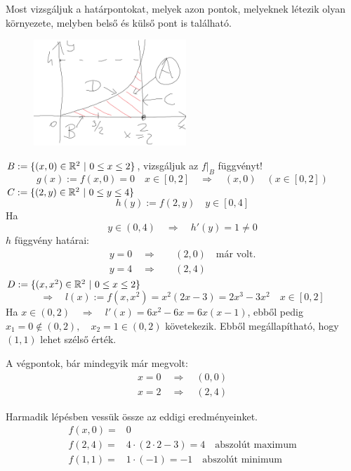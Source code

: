\documentclass[a4paper,11.5pt]{article}
\begin{document}
\begin{task}
		Most vizsgáljuk a határpontokat, melyek azon pontok, melyeknek létezik olyan környezete, melyben belső és külső pont is található.
		\begin{figure}[H]
			\centering
			\includegraphics[height=4cm]{../2zh/kepek/48.png}
			\caption{}
		\end{figure}
		
		$B:=\{(x,0)\in\mathbb{R}^2\ |\ 0\leq x\leq 2 \}$, vizsgáljuk az $f\big|_B$ függvényt!
		\[ g(x):=f(x,0)=0\quad x\in[0,2]\quad \Rightarrow\quad (x,0)\quad (x\in[0,2]) \]
		$C:=\{ (2,y)\in\mathbb{R}^2\ | \ 0\leq y\leq 4 \}$
		\[ h(y):=f(2,y)\quad y\in[0,4] \]
		Ha 
		\[ y\in(0,4)\quad \Rightarrow\quad h'(y)=1\not=0 \]
		$h$ függvény határai: 
		\begin{align*}
			y=0\quad \Rightarrow&\quad (2,0) \quad \text{már volt.}\\
			y=4\quad \Rightarrow&\quad (2,4)
		\end{align*}
		$D:=\{(x,x^2)\in\mathbb{R}^2\ | \ 0\leq x\leq 2\}$
		\[ \Rightarrow\quad l(x):=f(x,x^2)=x^2(2x-3)=2x^3-3x^2\quad x\in[0,2] \]
		Ha $x\in(0,2)\quad \Rightarrow\quad l'(x)=6x^2-6x=6x(x-1)$, ebből pedig $x_1=0\notin(0,2), \quad x_2=1\in(0,2)$ követekezik. Ebből megállapítható, hogy $(1,1)$ lehet szélső érték.
		
		A végpontok, bár mindegyik már megvolt:
		\begin{align*}
			x=0\quad \Rightarrow\quad (0,0)\\
			x=2\quad \Rightarrow\quad (2,4)
		\end{align*}
		
		Harmadik lépésben vessük össze az eddigi eredményeinket.
		\begin{align*}
			f(x,0)=&0\\
			f(2,4)=&4\cdot(2\cdot2-3)=4\quad \text{abszolút maximum}\\
			f(1,1)=&1\cdot(-1)=-1\quad \text{abszolút minimum}\
		\end{align*}
	\end{task}
\end{document}

